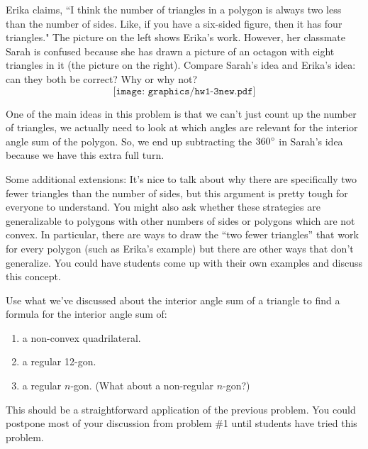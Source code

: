 \documentclass[nooutcomes]{ximera}
\begin{document}
\begin{problem}
Erika claims, ``I think the number of triangles in a polygon is always two less than the number of sides.  Like, if you have a six-sided figure, then it has four triangles."  The picture on the left shows Erika's work.  However, her classmate Sarah is confused because she has drawn a picture of an octagon with eight triangles in it (the picture on the right). Compare Sarah's idea and Erika's idea: can they both be correct? Why or why not?
		\[
		\texttt{[image: graphics/hw1-3new.pdf]}
		\]
		
		\begin{instructorNotes}
		One of the main ideas in this problem is that we can't just count up the number of triangles, we actually need to look at which angles are relevant for the interior angle sum of the polygon. So, we end up subtracting the $360\degree$ in Sarah's idea because we have this extra full turn.
		
		Some additional extensions:  It's nice to talk about why there are specifically two fewer triangles than the number of sides, but this argument is pretty tough for everyone to understand.  You might also ask whether these strategies are generalizable to polygons with other numbers of sides or polygons which are not convex.  In particular, there are ways to draw the ``two fewer triangles'' that work for every polygon (such as Erika's example) but there are other ways that don't generalize.  You could have students come up with their own examples and discuss this concept.
		\end{instructorNotes}
\end{problem}

\begin{problem}
Use what we've discussed about the interior angle sum of a triangle to find a formula for the interior angle sum of:
\begin{enumerate}
    \item a non-convex quadrilateral.
    \item a regular 12-gon.
    \item a regular $n$-gon. (What about a non-regular $n$-gon?)
\end{enumerate}

\begin{instructorNotes}
This should be a straightforward application of the previous problem.  You could postpone most of your discussion from problem \#1 until students have tried this problem.

\end{instructorNotes}
\end{problem}
\end{document}
